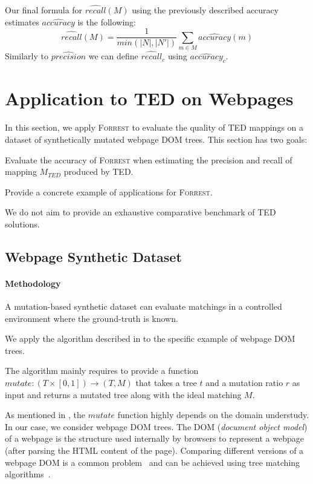 \documentclass{vldb}
\newcommand{\forrest}[0]{\textsc{Forrest}\xspace}
\begin{document}
Our final formula for $\hat{recall}(M)$ using the previously described accuracy estimates $\hat{accuracy}$ is the following:
\begin{equation}
    \hat{recall}(M) = \frac{1}{min(|N|, |N'|)} \sum_{m \in M} \hat{accuracy}(m)
\end{equation}
Similarly to $\hat{precision}$ we can define $\hat{recall}_c$ using $\hat{accuracy}_c$.

\section{Application to TED on Webpages\label{sec:application}}
In this section, we apply \forrest to evaluate the quality of TED mappings on a dataset of synthetically mutated webpage DOM trees.
This section has two goals:
\begin{compactenum}
	\item Evaluate the accuracy of \forrest when estimating the precision and recall of mapping $M_{TED}$ produced by TED.
	\item Provide a concrete example of applications for \forrest.
\end{compactenum}
We do not aim to provide an exhaustive comparative benchmark of TED solutions.

\subsection{Webpage Synthetic Dataset}
\paragraph*{Methodology}
A mutation-based synthetic dataset can evaluate matchings in a controlled environment where the ground-truth is known.

We apply the algorithm described in  to the specific example of webpage DOM trees.

The algorithm mainly requires to provide a function $mutate: (T \times [0, 1]) \to (T, M)$ that takes a tree $t$ and a mutation ratio $r$ as input and returns a mutated tree along with the ideal matching $M$.

As mentioned in , the $mutate$ function highly depends on the domain understudy. 
In our case, we consider webpage DOM trees.
The DOM (\emph{document object model}) of a webpage is the structure used internally by browsers to represent a webpage (after parsing the HTML content of the page).
Comparing different versions of a webpage DOM is a common problem~\cite{XXX} and can be achieved using tree matching algorithms~\cite{XXX}.
\end{document}
